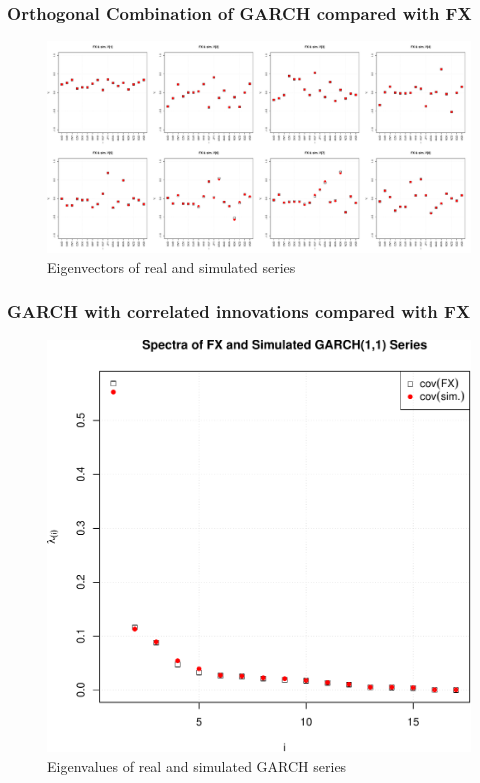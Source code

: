 \documentclass{beamer}
\begin{document}
\begin{frame}
  \frametitle{Orthogonal Combination of GARCH compared with FX}
  \begin{figure}[htb!]
    \centering
    \includegraphics[scale=0.2]{FX_OGARCH_eigenvectors.pdf}
    \caption{\scriptsize Eigenvectors of real and simulated series}
  \end{figure}
\end{frame}

\begin{frame}
  \frametitle{GARCH with correlated innovations compared with FX}
  \begin{figure}[htb!]
    \centering
    \includegraphics[scale=0.35]{FX_eigenvalues.pdf}
    \caption{\scriptsize Eigenvalues of real and simulated GARCH series}
  \end{figure}
\end{frame}
\end{document}
